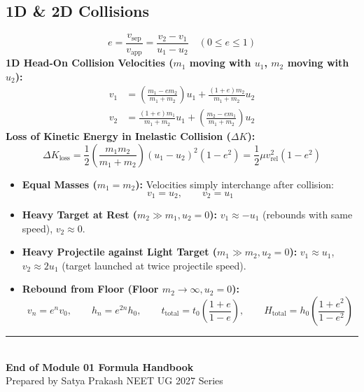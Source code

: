 \documentclass[11pt,a4paper]{article}
\begin{document}
\subsection{1D \& 2D Collisions}

\begin{formulabox}
\begin{equation}
  e = \frac{v_{\text{sep}}}{v_{\text{app}}} = \frac{v_2 - v_1}{u_1 - u_2} \quad (0 \le e \le 1)
\end{equation}
\textbf{1D Head-On Collision Velocities ($m_1$ moving with $u_1$, $m_2$ moving with $u_2$):}
\begin{align}
  v_1 &= \left(\frac{m_1 - e m_2}{m_1 + m_2}\right)u_1 + \frac{(1 + e)m_2}{m_1 + m_2}u_2 \\
  v_2 &= \frac{(1 + e)m_1}{m_1 + m_2}u_1 + \left(\frac{m_2 - e m_1}{m_1 + m_2}\right)u_2
\end{align}
\textbf{Loss of Kinetic Energy in Inelastic Collision ($\Delta K$):}
\begin{equation}
  \Delta K_{\text{loss}} = \frac{1}{2}\left(\frac{m_1 m_2}{m_1 + m_2}\right)(u_1 - u_2)^2 (1 - e^2) = \frac{1}{2}\mu v_{\text{rel}}^2 (1 - e^2)
\end{equation}
\end{formulabox}

\begin{usecasebox}[Special Elastic Collision Limits ($e=1$)]
\begin{itemize}
  \item \textbf{Equal Masses ($m_1 = m_2$):} Velocities simply interchange after collision:
  \begin{equation*}
    v_1 = u_2, \qquad v_2 = u_1
  \end{equation*}
  \item \textbf{Heavy Target at Rest ($m_2 \gg m_1, u_2 = 0$):} $v_1 \approx -u_1$ (rebounds with same speed), $v_2 \approx 0$.
  \item \textbf{Heavy Projectile against Light Target ($m_1 \gg m_2, u_2 = 0$):} $v_1 \approx u_1$, $v_2 \approx 2u_1$ (target launched at twice projectile speed).
  \item \textbf{Rebound from Floor (Floor $m_2 \to \infty, u_2 = 0$):}
  \begin{equation*}
    v_n = e^n v_0, \qquad h_n = e^{2n} h_0, \qquad t_{\text{total}} = t_0\left(\frac{1 + e}{1 - e}\right), \qquad H_{\text{total}} = h_0\left(\frac{1 + e^2}{1 - e^2}\right)
  \end{equation*}
\end{itemize}
\end{usecasebox}

\vspace{15pt}
\begin{center}
  \rule{0.6\textwidth}{0.8pt}\\[6pt]
  {\small\textbf{\color{primarydark}End of Module 01 Formula Handbook}}\\[2pt]
  {\footnotesize\color{accentblue}Prepared by Satya Prakash \quad\textbar\quad NEET UG 2027 Series}
\end{center}
\end{document}
